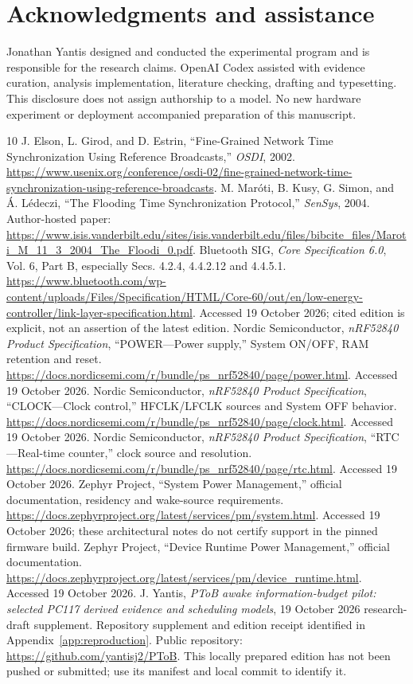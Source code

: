 \documentclass[11pt,letterpaper]{article}
\begin{document}
\section*{Acknowledgments and assistance}
Jonathan Yantis designed and conducted the experimental program and is responsible for the research claims. OpenAI Codex assisted with evidence curation, analysis implementation, literature checking, drafting and typesetting. This disclosure does not assign authorship to a model. No new hardware experiment or deployment accompanied preparation of this manuscript.

\begin{thebibliography}{10}\small
{} J. Elson, L. Girod, and D. Estrin, ``Fine-Grained Network Time Synchronization Using Reference Broadcasts,'' \emph{OSDI}, 2002. \url{https://www.usenix.org/conference/osdi-02/fine-grained-network-time-synchronization-using-reference-broadcasts}.
 M. Mar\'oti, B. Kusy, G. Simon, and \'A. L\'edeczi, ``The Flooding Time Synchronization Protocol,'' \emph{SenSys}, 2004. Author-hosted paper: \url{https://www.isis.vanderbilt.edu/sites/isis.vanderbilt.edu/files/bibcite_files/Maroti_M_11_3_2004_The_Floodi_0.pdf}.
 Bluetooth SIG, \emph{Core Specification 6.0}, Vol. 6, Part B, especially Secs. 4.2.4, 4.4.2.12 and 4.4.5.1. \url{https://www.bluetooth.com/wp-content/uploads/Files/Specification/HTML/Core-60/out/en/low-energy-controller/link-layer-specification.html}. Accessed 19 October 2026; cited edition is explicit, not an assertion of the latest edition.
 Nordic Semiconductor, \emph{nRF52840 Product Specification}, ``POWER---Power supply,'' System ON/OFF, RAM retention and reset. \url{https://docs.nordicsemi.com/r/bundle/ps_nrf52840/page/power.html}. Accessed 19 October 2026.
 Nordic Semiconductor, \emph{nRF52840 Product Specification}, ``CLOCK---Clock control,'' HFCLK/LFCLK sources and System OFF behavior. \url{https://docs.nordicsemi.com/r/bundle/ps_nrf52840/page/clock.html}. Accessed 19 October 2026.
 Nordic Semiconductor, \emph{nRF52840 Product Specification}, ``RTC---Real-time counter,'' clock source and resolution. \url{https://docs.nordicsemi.com/r/bundle/ps_nrf52840/page/rtc.html}. Accessed 19 October 2026.
 Zephyr Project, ``System Power Management,'' official documentation, residency and wake-source requirements. \url{https://docs.zephyrproject.org/latest/services/pm/system.html}. Accessed 19 October 2026; these architectural notes do not certify support in the pinned firmware build.
 Zephyr Project, ``Device Runtime Power Management,'' official documentation. \url{https://docs.zephyrproject.org/latest/services/pm/device_runtime.html}. Accessed 19 October 2026.
 J. Yantis, \emph{PToB awake information-budget pilot: selected PC117 derived evidence and scheduling models}, 19 October 2026 research-draft supplement. Repository supplement and edition receipt identified in Appendix~\ref{app:reproduction}. Public repository: \url{https://github.com/yantisj2/PToB}. This locally prepared edition has not been pushed or submitted; use its manifest and local commit to identify it.
\end{thebibliography}
\end{document}
